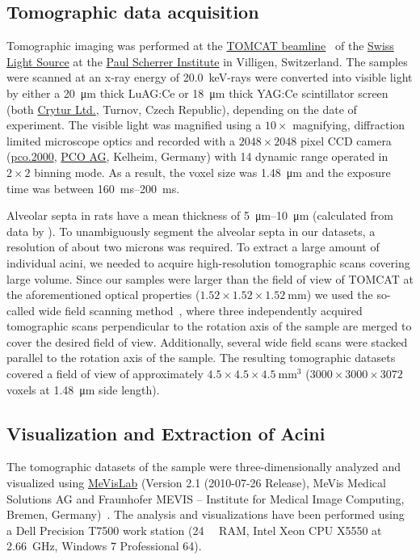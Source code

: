 \documentclass[final,paper=a4,DIV=calc,abstract,english]{scrartcl}
\begin{document}
\subsection{Tomographic data acquisition}
Tomographic imaging was performed at the \href{http://www.psi.ch/sls/tomcat/}{TOMCAT beamline}~\citep{Stampanoni2006a} of the \href{http://www.psi.ch/sls/}{Swiss Light Source} at the \href{http://www.psi.ch/}{Paul Scherrer Institute} in Villigen, Switzerland.
The samples were scanned at an x-ray energy of \SI{20.0}{\kilo\electronvolt}-rays were converted into visible light by either a \SI{20}{\micro\meter} thick LuAG:Ce or \SI{18}{\micro\meter} thick YAG:Ce scintillator screen (both \href{http://www.crytur.cz/}{Crytur Ltd.}, Turnov, Czech Republic), depending on the date of experiment.
The visible light was magnified using a \(10\times\) magnifying, diffraction limited microscope optics and recorded with a \(2048\times2048\) pixel CCD camera (\href{http://www.pco.de/sensitive-cameras/pco2000/}{pco.2000}, \href{http://www.pco.de/}{PCO AG}, Kelheim, Germany) with \SI{14}{\bit} dynamic range operated in \(2\times2\) binning mode.
As a result, the voxel size was \SI{1.48}{\micro\meter} and the exposure time was between \SIrange{160}{200}{\milli\second}.

Alveolar septa in rats have a mean thickness of \SIrange{5}{10}{\micro\meter} (calculated from data by \citet{Burri1974}).
To unambiguously segment the alveolar septa in our datasets, a resolution of about two microns was required.
To extract a large amount of individual acini, we needed to acquire high-resolution tomographic scans covering  large volume.
Since our samples were larger than the field of view of TOMCAT at the aforementioned optical properties (\(1.52\times1.52\times\SI{1.52}{\milli\meter}\)) we used the so-called wide field scanning method~\citep{Haberthuer2010}, where three independently acquired tomographic scans perpendicular to the rotation axis of the sample are merged to cover the desired field of view.
Additionally, several wide field scans were stacked parallel to the rotation axis of the sample.
The resulting tomographic datasets covered a field of view of approximately \(4.5\times4.5\times\SI{4.5}{\milli\meter\cubed}\) (\(3000\times3000\times3072\) voxels at \SI{1.48}{\micro\meter} side length).

\subsection{Visualization and Extraction of Acini}
The tomographic datasets of the sample were three-dimensionally analyzed and visualized using \href{http://mevislab.de}{MeVisLab} (Version 2.1 (2010-07-26 Release), MeVis Medical Solutions AG and Fraunhofer MEVIS -- Institute for Medical Image Computing, Bremen, Germany)~\citep{Bitter2007}.
The analysis and visualizations have been performed using a Dell Precision T7500 work station (\SI{24}{\giga\byte} RAM, Intel Xeon CPU X5550 at \SI{2.66}{\giga\hertz}, Windows 7 Professional \SI{64}{\bit}).
\end{document}
